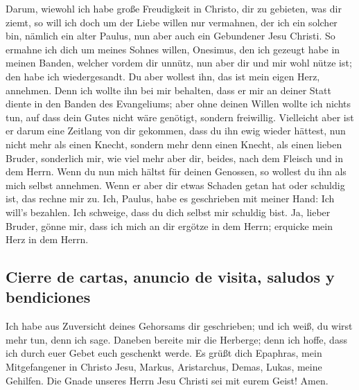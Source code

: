  Darum, wiewohl ich habe große Freudigkeit in Christo, dir
zu gebieten, was dir ziemt,  so will ich doch um der Liebe
willen nur vermahnen, der ich ein solcher bin, nämlich ein alter Paulus,
nun aber auch ein Gebundener Jesu Christi.  So ermahne
ich dich um meines Sohnes willen, Onesimus, den ich gezeugt habe in
meinen Banden,  welcher vordem dir unnütz, nun aber dir
und mir wohl nütze ist; den habe ich wiedergesandt.  Du
aber wollest ihn, das ist mein eigen Herz, annehmen. 
Denn ich wollte ihn bei mir behalten, dass er mir an deiner Statt diente
in den Banden des Evangeliums;  aber ohne deinen Willen
wollte ich nichts tun, auf dass dein Gutes nicht wäre genötigt, sondern
freiwillig.  Vielleicht aber ist er darum eine Zeitlang
von dir gekommen, dass du ihn ewig wieder hättest,  nun
nicht mehr als einen Knecht, sondern mehr denn einen Knecht, als einen
lieben Bruder, sonderlich mir, wie viel mehr aber dir, beides, nach dem
Fleisch und in dem Herrn.  Wenn du nun mich hältst für
deinen Genossen, so wollest du ihn als mich selbst annehmen.
 Wenn er aber dir etwas Schaden getan hat oder schuldig
ist, das rechne mir zu.  Ich, Paulus, habe es geschrieben
mit meiner Hand: Ich will's bezahlen. Ich schweige, dass du dich selbst
mir schuldig bist.  Ja, lieber Bruder, gönne mir, dass
ich mich an dir ergötze in dem Herrn; erquicke mein Herz in dem Herrn.

\hypertarget{cierre-de-cartas-anuncio-de-visita-saludos-y-bendiciones}{%
\subsection{Cierre de cartas, anuncio de visita, saludos y
bendiciones}\label{cierre-de-cartas-anuncio-de-visita-saludos-y-bendiciones}}

 Ich habe aus Zuversicht deines Gehorsams dir
geschrieben; und ich weiß, du wirst mehr tun, denn ich sage.
 Daneben bereite mir die Herberge; denn ich hoffe, dass
ich durch euer Gebet euch geschenkt werde.  Es grüßt dich
Epaphras, mein Mitgefangener in Christo Jesu,  Markus,
Aristarchus, Demas, Lukas, meine Gehilfen.  Die Gnade
unseres Herrn Jesu Christi sei mit eurem Geist! Amen.
